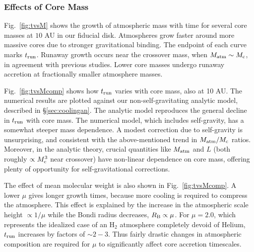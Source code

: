 \documentclass[apj, numberedappendix]{emulateapj}
\newcommand{\Fig}[1]{Fig.~\ref{#1}}
\newcommand{\RB}{R_{\rm B}}
\newcommand{\co}{_{\rm c}}
\begin{document}
\subsubsection{Effects of Core Mass}
\label{Mct}

\Fig{fig:tvsM} shows the growth of atmospheric mass with time for several core masses at $10$ AU in our fiducial disk.  Atmospheres grow faster around more massive cores due to stronger gravitational binding.  The endpoint of each curve marks $t_{\rm run}$.   Runaway growth occurs near the crossover mass, when $M_{\rm atm} \sim M\co$, in agreement with previous studies. Lower core masses undergo runaway accretion at fractionally smaller atmosphere masses. %

\Fig{fig:tvsMcomp} shows how $t_{\rm run}$ varies with core mass, also at 10 AU.  The numerical results are plotted against our non-self-gravitating analytic model, described in \S\ref{sec:coolingan}.  The analytic model reproduces the general decline in $t_{\rm run}$ with core mass.  The numerical model, which includes self-gravity, has a somewhat steeper mass dependence.  A modest correction due to self-gravity is unsurprising, and consistent with the above-mentioned trend in $M_{\rm atm}/M\co$ ratios.  Moreover, in the analytic theory, crucial quantities like $M_{\rm atm}$ and $L$ (both roughly $\propto M\co^3$ near crossover) have non-linear dependence on core mass, offering plenty of opportunity for self-gravitational corrections.

The effect of mean molecular weight is also shown in \Fig{fig:tvsMcomp}.  A lower $\mu$ gives longer growth times, because more cooling is required to compress the atmosphere.  This effect is explained by the increase in the atmospheric scale height $\propto 1/\mu$ while the Bondi radius decreases, $\RB \propto \mu$.  For $\mu = 2.0$, which represents the idealized case of an H$_2$ atmosphere completely devoid of Helium, $t_{\rm run}$ increases by factors of $\sim 2 - 3$.  Thus fairly drastic changes in atmospheric composition are required for $\mu$ to significantly affect core accretion timescales.

\end{document}

